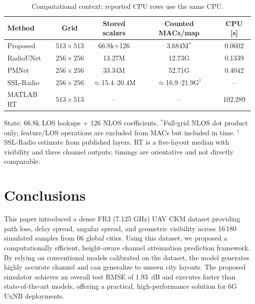 \documentclass[10pt,conference,letterpaper]{IEEEtran}
\begin{document}
\begin{table}[!t]
\centering
\caption{Computational context; reported CPU rows use the same CPU.}
\label{tab:compute}
\scriptsize
\setlength{\tabcolsep}{2.2pt}
\begin{tabular}{@{}lcccc@{}}
\toprule
Method & Grid & Stored scalars & Counted MACs/map & CPU [s] \\
\midrule
Proposed & $513\times513$ & 66.8k+126 & 3.684M$^\ast$ & 0.0602 \\
RadioUNet~\cite{radiounet2020} & $256\times256$ & 13.27M & 12.73G & 0.1339 \\
PMNet~\cite{pmnet2023} & $256\times256$ & 33.34M & 52.71G & 0.4042 \\
SSL-Radio~\cite{sslradio2025} & $256\times256$ & $\approx$15.4--20.4M & $\approx$16.9--21.9G$^\dagger$ & -- \\
MATLAB RT & $513\times513$ & -- & -- & 102.289 \\
\bottomrule
\end{tabular}
\parbox{\columnwidth}{\scriptsize State: 66.8k LOS lookups + 126 NLOS coefficients. $^\ast$Full-grid NLOS dot product only; feature/LOS operations are excluded from MACs but included in time. $^\dagger$SSL-Radio estimate from published layers. RT is a five-layout median with visibility and three channel outputs; timings are orientative and not directly comparable.}
\end{table}

\section{Conclusions}\label{sec:conclusions}
This paper introduced a dense FR3 (7.125 GHz) UAV CKM dataset providing path loss, delay spread, angular spread, and geometric visibility across 16\,180 simulated samples from 66 global cities. Using this dataset, we proposed a computationally efficient, height-aware channel attenuation prediction framework. By relying on conventional models calibrated on the dataset, the model generates highly accurate channel and can generalize to unseen city layouts. The proposed simulator achieves an overall test RMSE of \SI{1.93}{dB} and executes faster than state-of-the-art models, offering a practical, high-performance solution for 6G UxNB deployments.



\end{document}
